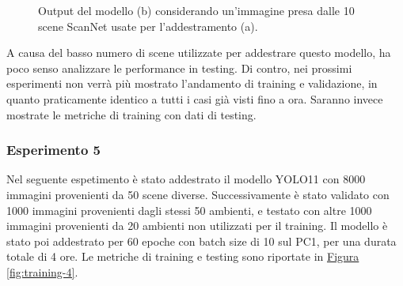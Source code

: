 \documentclass[12pt]{report}
\begin{document}
\begin{figure}[h!]
	\centering
	\hspace{0.01\textwidth}
	\caption{Output del modello (b) considerando un'immagine presa dalle 10 scene ScanNet usate per l'addestramento (a).}
	\label{fig:prediction-2}
\end{figure}

A causa del basso numero di scene utilizzate per addestrare questo modello, ha poco senso analizzare le performance in testing. Di contro, nei prossimi esperimenti non verrà più mostrato l'andamento di training e validazione, in quanto praticamente identico a tutti i casi già visti fino a ora. Saranno invece mostrate le metriche di training con dati di testing.

\subsubsection{Esperimento 5}
\label{sec:esperimento_5}

Nel seguente espetimento è stato addestrato il modello YOLO11 con 8000 immagini provenienti da 50 scene diverse. Successivamente è stato validato con 1000 immagini provenienti dagli stessi 50 ambienti, e testato con altre 1000 immagini provenienti da 20 ambienti non utilizzati per il training. Il modello è stato poi addestrato per 60 epoche con batch size di 10 sul PC1, per una durata totale di 4 ore. Le metriche di training e testing sono riportate in \hyperref[fig:training-4]{Figura \ref{fig:training-4}}.
\end{document}
